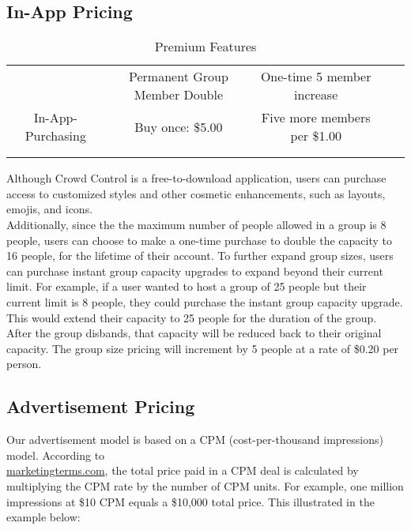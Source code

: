 \subsection{In-App Pricing}

\begin{table}[]
\centering
\caption{Premium Features}
\label{premium-features}
\begin{tabular}{lllll}
\cline{1-3}
\multicolumn{1}{|c|}{} & \multicolumn{1}{c|}{Permanent Group Member Double} & \multicolumn{1}{c|}{One-time 5 member increase} & \\ \cline{1-3}
\multicolumn{1}{|c|}{In-App-Purchasing} & \multicolumn{1}{c|}{Buy once: \$5.00} & \multicolumn{1}{c|}{Five more members per \$1.00} &  \\ \cline{1-3}
                       &                       &                       &                       &  \\
                       &                       &                       &                       & 
\end{tabular}
\end{table}

Although Crowd Control is a free-to-download application, users can purchase access to customized styles and other cosmetic enhancements, such as layouts, emojis, and icons. \\

Additionally, since the the maximum number of people allowed in a group is 8 people, users can choose to make a one-time purchase to double the capacity to 16 people, for the lifetime of their account. To further expand group sizes, users can purchase instant group capacity upgrades to expand beyond their current limit. For example, if a user wanted to host a group of 25 people but their current limit is 8 people, they could purchase the instant group capacity upgrade. This would extend their capacity to 25 people for the duration of the group. After the group disbands, that capacity will be reduced back to their original capacity. The group size pricing will increment by 5 people at a rate of \$0.20 per person.

\subsection{Advertisement Pricing}
Our advertisement model is based on a CPM (cost-per-thousand impressions) model. According to \\
\url{marketingterms.com}, the total price paid in a CPM deal is calculated by multiplying the CPM rate by the number of CPM units. For example, one million impressions at \$10 CPM equals a \$10,000 total price. This illustrated in the example below:

